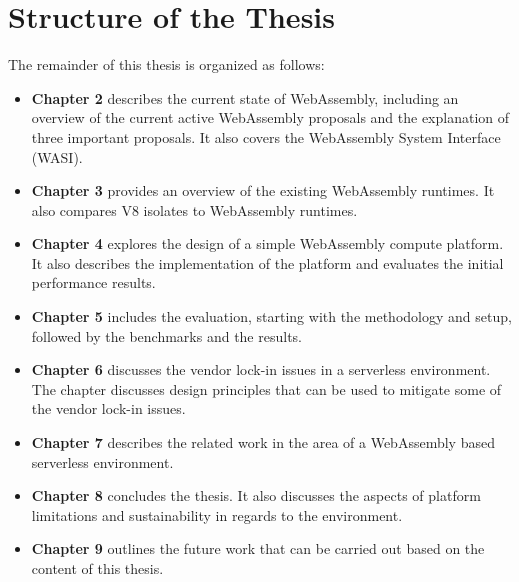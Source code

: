 \section{Structure of the Thesis}
\label{sec:structure-of-the-thesis}

The remainder of this thesis is organized as follows:
\begin{itemize}
  \item \textbf{Chapter 2} describes the current state of WebAssembly, including an overview of the current active WebAssembly proposals and the explanation of three important proposals. It also covers the WebAssembly System Interface (WASI).
  \item \textbf{Chapter 3} provides an overview of the existing WebAssembly runtimes. It also compares \gls{V8} isolates to WebAssembly runtimes.
  \item \textbf{Chapter 4} explores the design of a simple WebAssembly compute platform. It also describes the implementation of the platform and evaluates the initial performance results.
  \item \textbf{Chapter 5} includes the evaluation, starting with the methodology and setup, followed by the benchmarks and the results.
  \item \textbf{Chapter 6} discusses the vendor lock-in issues in a serverless environment. The chapter discusses design principles that can be used to mitigate some of the vendor lock-in issues.
  \item \textbf{Chapter 7} describes the related work in the area of a WebAssembly based serverless environment.
  \item \textbf{Chapter 8} concludes the thesis. It also discusses the aspects of platform limitations and sustainability in regards to the environment.
  \item \textbf{Chapter 9} outlines the future work that can be carried out based on the content of this thesis.
\end{itemize}
